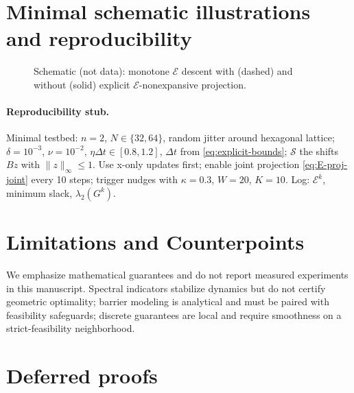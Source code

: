 \documentclass[11pt]{article}
\theoremstyle{remark}
\theoremstyle{definition}
\newcommand{\ShiftSet}{\mathcal{S}}            %
\begin{document}
\section{Minimal schematic illustrations and reproducibility}\label{sec:minimal-illustrations}
\begin{figure}[htbp]
\centering
{}
\caption{Schematic (not data): monotone $\mathcal{E}$ descent with (dashed) and without (solid) explicit \(\mathcal{E}\)-nonexpansive projection.}
\label{fig:schematic-energy}
\end{figure}

\paragraph{Reproducibility stub.} Minimal testbed: $n=2$, $N\in\{32,64\}$, random jitter around hexagonal lattice; $\delta=10^{-3}$, $\nu=10^{-2}$, $\eta\Delta t\in[0.8,1.2]$, $\Delta t$ from \eqref{eq:explicit-bounds}; $\ShiftSet$ the shifts $Bz$ with $\|z\|_\infty\le 1$. Use x-only updates first; enable joint projection \eqref{eq:E-proj-joint} every 10 steps; trigger nudges with $\kappa=0.3$, $W=20$, $K=10$. Log: $\mathcal{E}^k$, minimum slack, $\lambda_2(G^k)$.

\section{Limitations and Counterpoints}
We emphasize mathematical guarantees and do not report measured experiments in this manuscript. Spectral indicators stabilize dynamics but do not certify geometric optimality; barrier modeling is analytical and must be paired with feasibility safeguards; discrete guarantees are local and require smoothness on a strict-feasibility neighborhood.

\appendix
\section{Deferred proofs}\label{app:proofs}
\end{document}
